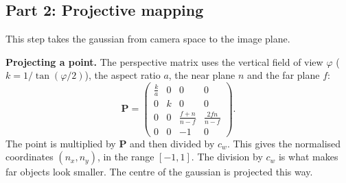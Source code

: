 \documentclass[9pt,twocolumn,a4paper]{extarticle}
\begin{document}
\subsection{Part 2: Projective mapping}
\label{sec:ewa}
This step takes the gaussian from camera space to the image plane.

\textbf{Projecting a point.} The perspective matrix uses the vertical field of view $\varphi$ ($k=1/\tan(\varphi/2)$), the aspect ratio $a$, the near plane $n$ and the far plane $f$:
\begin{equation}
\mathbf{P}=\begin{pmatrix}
\frac{k}{a}&0&0&0\\0&k&0&0\\
0&0&\frac{f+n}{n-f}&\frac{2fn}{n-f}\\0&0&-1&0\end{pmatrix}.
\label{eq:proj}
\end{equation}
The point is multiplied by $\mathbf{P}$ and then divided by $c_w$. This gives the normalised coordinates $(n_x,n_y)$, in the range $[-1,1]$. The division by $c_w$ is what makes far objects look smaller. The centre of the gaussian is projected this way.

\par\noindent{}\par\vspace{3pt}
\end{document}
